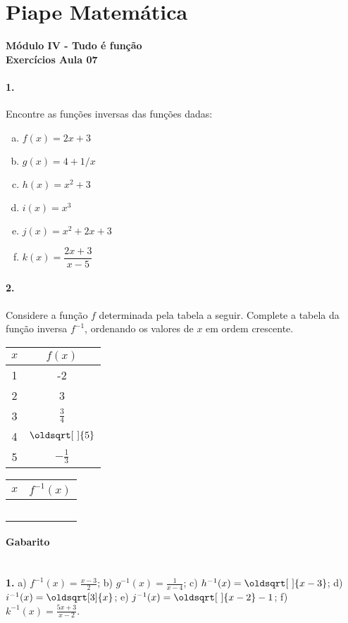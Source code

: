 \documentclass[a4paper,12pt]{article}
\renewcommand*{\sqrt}[2][\ ]{\oldsqrt[#1]{#2}}
\begin{document}
 
  
\section*{Piape Matemática} 
\textbf{Módulo IV - Tudo é função}\\
\textbf{Exercícios Aula 07}    

\begin{multicols}{2} 
 
\paragraph*{1.}  Encontre as funções inversas das funções dadas:

\begin{enumerate}[a)]
\item $f(x) = 2x+3$
\item $g(x) = 4 + 1/x$
\item $h(x) = x^2 + 3$
\item $i(x) = x^3$ 
\item $j(x) = x^2 + 2x + 3$
\item $k(x) = \dfrac{2x + 3}{x - 5}$
\end{enumerate}

\paragraph*{2.} Considere a função $f$ determinada pela tabela a seguir. Complete a tabela da função inversa $f^{-1}$, ordenando os valores de $x$ em ordem crescente.
\begin{center}
\begin{tabular}{|c|c|}
\hline
$x$ & $f(x)$ \\
\hline
1 & -2 \\
2 & 3 \\
3 & $\frac{3}{4}$ \\
4 & $\sqrt{5}$ \\
5 & $-\frac{1}{3}$ \\
\hline
\end{tabular}\hspace*{16mm}
\begin{tabular}{|c|c|}
    \hline
$x$ & $f^{-1}(x)$ \\
\hline
    & \\
    & \\
    & \\
    & \\
    & \\
\hline
\end{tabular}
\end{center}


  
\end{multicols}

\vspace*{\fill}
{\footnotesize
\paragraph*{Gabarito} \hspace*{\fill}\\
\textbf{1.} a) $f^{-1}(x) = \frac{x-3}{2}$; b) $g^{-1}(x) = \frac{1}{x-4}$; c) $h^{-1}(x) = \sqrt{x-3}$; d) $i^{-1}(x) = \sqrt[3]{x}$; e) $j^{-1}(x) = \sqrt{x-2} - 1 $; f) $k^{-1}(x) = \frac{5x + 3}{x - 2}$.
}
\end{document}
